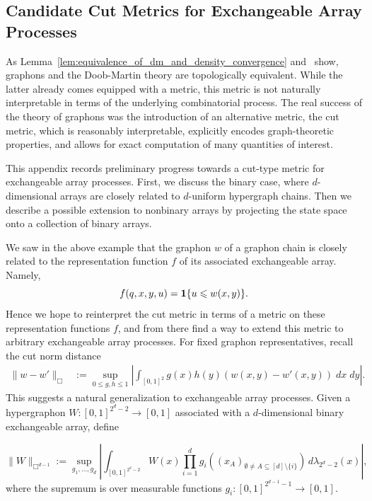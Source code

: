\newpage
\begin{subappendices}

\section{Candidate Cut Metrics for Exchangeable Array Processes}
\label{appendix:cut_metric_partial_progress}

As Lemma~\ref{lem:equivalence_of_dm_and_density_convergence} and~\cite{grubel2015_persisting_randomness_graphs_search_trees}
show, graphons and the Doob-Martin theory are topologically equivalent.
While the latter already comes equipped with a metric, this
metric is not naturally interpretable in terms of the underlying combinatorial process.
The real success of the theory of graphons was the introduction of an alternative metric, the cut metric, which
is reasonably interpretable, explicitly encodes graph-theoretic properties, and allows for exact
computation of many quantities of interest.

This appendix records preliminary progress towards a cut-type metric for
exchangeable array processes. First, we discuss the binary case, where
$d$-dimensional arrays are closely related to $d$-uniform hypergraph chains.
Then we describe a possible extension to nonbinary arrays by projecting the
state space onto a collection of binary arrays.

We saw in the above example that the graphon $w$ of a graphon
chain is closely related to the representation function $f$ of
its associated exchangeable array. Namely,
\[f(q,x,y,u) = \mathbf{1} \{u \leqslant w(x,y)\}.\]
\noindent Hence we hope to reinterpret the cut metric in terms of a metric
on these representation functions $f$, and from there find a way to extend
this metric to arbitrary exchangeable array processes. For fixed graphon
representatives, recall the cut norm distance
%
\begin{align*}
    \lVert w-w'\rVert_\Box & := \sup_{0 \leq g,h \leq 1} \left | \int_{[0,1]^2}
 g(x)h(y)(w(x,y) - w'(x,y)) \; dx \; dy\right|.
\end{align*}
%
\noindent This suggests a natural generalization to exchangeable array processes.
Given a hypergraphon $W:[0,1]^{2^d-2}\to[0,1]$ associated with a
$d$-dimensional binary exchangeable array, define

\[
\lVert W\rVert_{\Box^{d-1}}
:= \sup_{g_1,\ldots,g_d}
\left|\int_{[0,1]^{2^d-2}} W(x)
\prod_{i=1}^d g_i\left((x_A)_{\emptyset\neq A\subseteq[d]\setminus\{i\}}\right)
\,d\lambda_{2^d-2}(x)\right|,
\]
where the supremum is over measurable functions
$g_i:[0,1]^{2^{d-1}-1}\to[0,1]$.


\end{subappendices}
